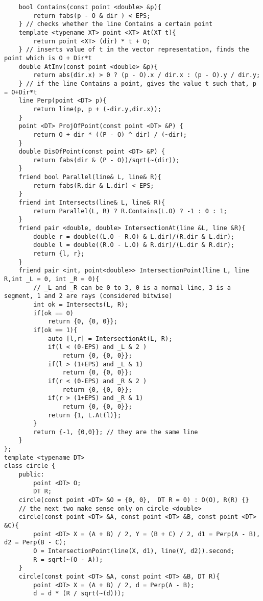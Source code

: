 \documentclass[10pt,a4paper,onesided]{article}
\begin{document}
\begin{multicols*}{3}
\begin{lstlisting}
    bool Contains(const point <double> &p){ 
        return fabs(p - O & dir ) < EPS;
    } // checks whether the line Contains a certain point
    template <typename XT> point <XT> At(XT t){
        return point <XT> (dir) * t + O;
    } // inserts value of t in the vector representation, finds the point which is O + Dir*t
    double AtInv(const point <double> &p){
        return abs(dir.x) > 0 ? (p - O).x / dir.x : (p - O).y / dir.y;
    } // if the line Contains a point, gives the value t such that, p = O+Dir*t
    line Perp(point <DT> p){
        return line(p, p + (-dir.y,dir.x));
    }
    point <DT> ProjOfPoint(const point <DT> &P) {
        return O + dir * ((P - O) ^ dir) / (~dir);
    }
    double DisOfPoint(const point <DT> &P) {
        return fabs(dir & (P - O))/sqrt(~(dir));   
    }
    friend bool Parallel(line& L, line& R){
        return fabs(R.dir & L.dir) < EPS;
    }
    friend int Intersects(line& L, line& R){
        return Parallel(L, R) ? R.Contains(L.O) ? -1 : 0 : 1;
    }
    friend pair <double, double> IntersectionAt(line &L, line &R){
        double r = double((L.O - R.O) & L.dir)/(R.dir & L.dir);
        double l = double((R.O - L.O) & R.dir)/(L.dir & R.dir);
        return {l, r};
    }
    friend pair <int, point<double>> IntersectionPoint(line L, line R,int _L = 0, int _R = 0){
        // _L and _R can be 0 to 3, 0 is a normal line, 3 is a segment, 1 and 2 are rays (considered bitwise)
        int ok = Intersects(L, R);
        if(ok == 0)
            return {0, {0, 0}};
        if(ok == 1){
            auto [l,r] = IntersectionAt(L, R);
            if(l < (0-EPS) and _L & 2 )
                return {0, {0, 0}};
            if(l > (1+EPS) and _L & 1)
                return {0, {0, 0}};
            if(r < (0-EPS) and _R & 2 )
                return {0, {0, 0}};
            if(r > (1+EPS) and _R & 1)
                return {0, {0, 0}};
            return {1, L.At(l)};
        }
        return {-1, {0,0}}; // they are the same line
    }
};
template <typename DT> 
class circle {
    public:
        point <DT> O;
        DT R;
    circle(const point <DT> &O = {0, 0},  DT R = 0) : O(O), R(R) {}
    // the next two make sense only on circle <double>
    circle(const point <DT> &A, const point <DT> &B, const point <DT> &C){
        point <DT> X = (A + B) / 2, Y = (B + C) / 2, d1 = Perp(A - B), d2 = Perp(B - C);
        O = IntersectionPoint(line(X, d1), line(Y, d2)).second;
        R = sqrt(~(O - A));
    }
    circle(const point <DT> &A, const point <DT> &B, DT R){
        point <DT> X = (A + B) / 2, d = Perp(A - B);
        d = d * (R / sqrt(~(d)));

\end{lstlisting}
\end{multicols*}
\end{document}
